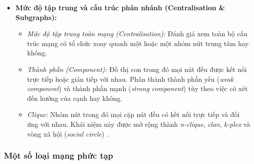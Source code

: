 \documentclass[14pt,a4paper]{extarticle}
\begin{document}
\begin{itemize}
    \item \textbf{Mức độ tập trung và cấu trúc phân nhánh (Centralisation \& Subgraphs):}
    \begin{itemize}
        \item \textit{Mức độ tập trung toàn mạng (Centralisation):} Đánh giá xem toàn bộ cấu trúc mạng có tổ chức xoay quanh một hoặc một nhóm nút trung tâm hay không.
        \item \textit{Thành phần (Component):} Đồ thị con trong đó mọi nút đều được kết nối trực tiếp hoặc gián tiếp với nhau. Phân thành thành phần yếu (\textit{weak component}) và thành phần mạnh (\textit{strong component}) tùy theo việc có xét đến hướng của cạnh hay không.
        \item \textit{Clique:} Nhóm nút trong đó mọi cặp nút đều có kết nối trực tiếp và đối ứng với nhau. Khái niệm này được mở rộng thành \textit{n-clique}, \textit{clan}, \textit{k-plex} và vòng xã hội (\textit{social circle})~\cite{Scott2012}.
    \end{itemize}
\end{itemize}

\subsubsection{Một số loại mạng phức tạp}
\end{document}
